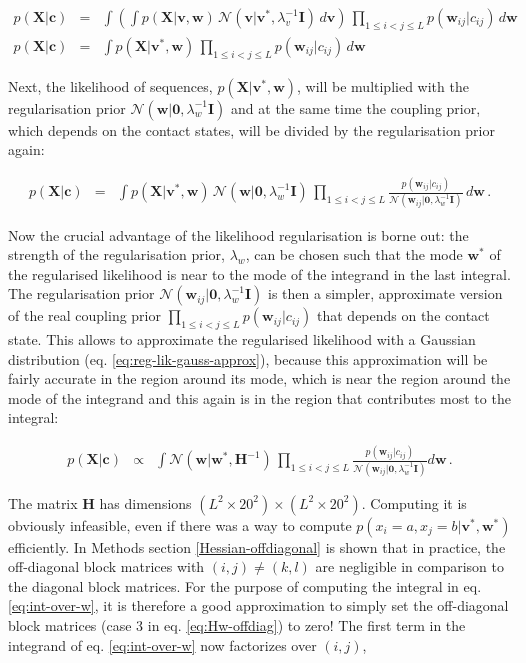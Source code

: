 \documentclass[11pt,a4paper,twoside]{book}
\newcommand{\eq}{\!=\!}
\newcommand{\Gauss}{\mathcal{N}}
\renewcommand{\H}{\mathbf{H}}
\newcommand{\I}{\mathbf{I}}
\renewcommand{\c}{\mathbf{c}}
\newcommand{\cij}{c_{ij}}
\renewcommand{\v}{\mathbf{v}}
\newcommand{\w}{\mathbf{w}}
\newcommand{\wij}{\mathbf{w}_{ij}}
\newcommand{\X}{\mathbf{X}}
\theoremstyle{definition}
\theoremstyle{definition}
\theoremstyle{remark}
\begin{document}
\begin{eqnarray}
    p(\X | \c) &=& \int \left( \int  p(\X | \v,\w) \, \Gauss(\v|\v^*,\lambda_v^{-1} \I) \,d\v \right) \, \prod_{1\le i<j\le L} p(\wij|\cij) \, d\w  \\
    p(\X | \c) &=& \int  p(\X | \v^*,\w) \, \prod_{1\le i<j\le L} p(\wij|\cij) \, d\w  
\label{eq:in_over_w_1}
\end{eqnarray}

Next, the likelihood of sequences, \(p(\X | \v^*,\w)\), will be
multiplied with the regularisation prior
\(\Gauss(\w|\mathbf{0}, \lambda_w^{-1} \I)\) and at the same time the
coupling prior, which depends on the contact states, will be divided by
the regularisation prior again:

\begin{eqnarray}
      p(\X | \c) &=& \int p(\X | \v^*,\w) \, \Gauss(\w|\mathbf{0}, \lambda_w^{-1} \I) \, \prod_{1\le i<j\le L} \frac{p(\wij|\cij)}{\Gauss(\wij|\mathbf{0}, \lambda_w^{-1} \I)} \,d\w \, .
\end{eqnarray}

Now the crucial advantage of the likelihood regularisation is borne out:
the strength of the regularisation prior, \(\lambda_w\), can be chosen
such that the mode \(\w^*\) of the regularised likelihood is near to the
mode of the integrand in the last integral. The regularisation prior
\(\Gauss(\wij|\mathbf{0}, \lambda_w^{-1} \I)\) is then a simpler,
approximate version of the real coupling prior
\(\prod_{1\le i<j\le L} p(\wij|\cij)\) that depends on the contact
state. This allows to approximate the regularised likelihood with a
Gaussian distribution (eq. \eqref{eq:reg-lik-gauss-approx}), because this
approximation will be fairly accurate in the region around its mode,
which is near the region around the mode of the integrand and this again
is in the region that contributes most to the integral:

\begin{eqnarray}
      p(\X | \c) &\propto& \int \Gauss (\w | \w^*, \H^{-1} ) \, \prod_{1 \le i<j \le L} \frac{p(\wij | \cij)}{\Gauss(\wij|\mathbf{0}, \lambda_w^{-1} \I)} d\w \,.
\label{eq:int-over-w}
\end{eqnarray}

The matrix \(\H\) has dimensions
\((L^2 \times 20^2) \times (L^2 \times 20^2)\). Computing it is
obviously infeasible, even if there was a way to compute
\(p(x_i \eq a, x_j \eq b| \v^*,\w^*)\) efficiently. In Methods section
\ref{Hessian-offdiagonal} is shown that in practice, the off-diagonal
block matrices with \((i,j) \ne (k,l)\) are negligible in comparison to
the diagonal block matrices. For the purpose of computing the integral
in eq. \eqref{eq:int-over-w}, it is therefore a good approximation to
simply set the off-diagonal block matrices (case 3 in eq.
\eqref{eq:Hw-offdiag}) to zero! The first term in the integrand of eq.
\eqref{eq:int-over-w} now factorizes over \((i,j)\),
\end{document}
